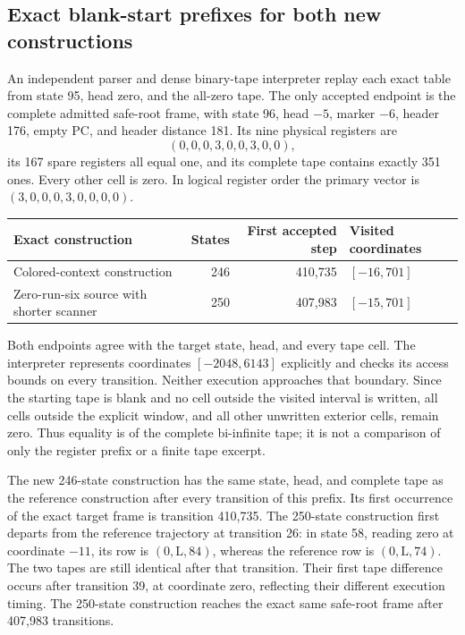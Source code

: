 \subsection{Exact blank-start prefixes for both new constructions}
An independent parser and dense binary-tape interpreter replay each exact
table from state 95, head zero, and the all-zero tape. The only accepted
endpoint is the complete admitted safe-root frame, with state 96, head
$-5$, marker $-6$, header 176, empty PC, and header distance 181. Its nine
physical registers are
\[
(0,0,0,3,0,0,3,0,0),
\]
its 167 spare registers all equal one, and its complete tape contains
exactly 351 ones. Every other cell is zero. In logical register order the
primary vector is $(3,0,0,0,3,0,0,0,0)$.

\begin{center}
\begin{tabular}{l r r l}
Exact construction & States & First accepted step & Visited coordinates\\\hline
Colored-context construction & 246 & 410,735 & $[-16,701]$\\
Zero-run-six source with shorter scanner & 250 & 407,983 & $[-15,701]$\\
\end{tabular}
\end{center}
Both endpoints agree with the target state, head, and every tape cell.
The interpreter represents coordinates $[-2048,6143]$ explicitly and checks
its access bounds on every transition. Neither execution approaches that
boundary. Since the starting tape is blank and no cell outside the visited
interval is written, all cells outside the explicit window, and all other
unwritten exterior cells, remain zero. Thus equality is of the complete
bi-infinite tape; it is not a comparison of only the register prefix or a
finite tape excerpt.

The new 246-state construction has the same state, head, and complete tape
as the reference construction after every transition of this prefix. Its
first occurrence of the exact target frame is transition 410,735. The
250-state construction first departs from the reference trajectory at
transition 26: in state 58, reading zero at coordinate $-11$, its row is
$(0,\mathrm L,84)$, whereas the reference row is $(0,\mathrm L,74)$.
The two tapes are still identical after that transition. Their first tape
difference occurs after transition 39, at coordinate zero, reflecting their
different execution timing. The 250-state construction reaches the exact
same safe-root frame after 407,983 transitions.


